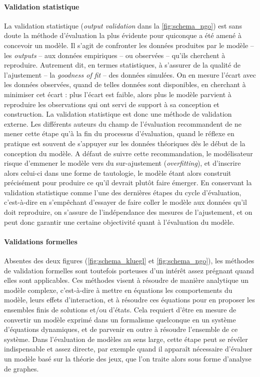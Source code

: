 \paragraph{Validation statistique}
La validation statistique (\og \textit{output validation}\fg{} dans la \cref{fig:schema_ngo}) est sans doute la méthode d'évaluation la plus évidente pour quiconque a été amené à concevoir un modèle. Il s'agit de confronter les données produites par le modèle -- les \textit{outputs} --
aux données empiriques -- ou observées -- qu'ils cherchent à reproduire.
Autrement dit, en termes statistiques, à s'assurer de la qualité de l'ajustement -- la \textit{goodness of fit} -- des données simulées.
On en mesure l'écart avec les données observées, quand de telles données sont disponibles, en cherchant à minimiser cet écart :
	plus l'écart est faible, alors plus le modèle parvient à reproduire les observations qui ont servi de support à sa conception et construction.
La validation statistique est donc une méthode de validation externe.
Les différents auteurs du champ de l'évaluation recommandent de ne mener cette étape qu'à la fin du processus d'évaluation, quand le réflexe en pratique est souvent de s'appuyer sur les données théoriques dès le début de la conception du modèle.
A défaut de suivre cette recommandation, le modélisateur risque d'emmener le modèle vers du \og sur-ajustement \fg{} (\textit{overfitting}), et d'inscrire alors celui-ci dans une forme de tautologie, le modèle étant alors construit précisément pour produire ce qu'il devrait plutôt faire émerger.
En conservant la validation statistique comme l'une des dernières étapes du cycle d'évaluation, c'est-à-dire en s'empêchant d'essayer de faire coller le modèle aux données qu'il doit reproduire, on s'assure de l'indépendance des mesures de l'ajustement, et on peut donc garantir une certaine objectivité quant à l'évaluation du modèle.

\paragraph{Validations formelles}
Absentes des deux figures (\ref{fig:schema_kluegl} et \ref{fig:schema_ngo}), les méthodes de validation formelles sont toutefois porteuses d'un intérêt assez prégnant quand elles sont applicables.
Ces méthodes visent à résoudre de manière analytique un modèle complexe, c'est-à-dire à mettre en équations les comportements du modèle, leurs effets d'interaction, et à résoudre ces équations pour en proposer les ensembles finis de solutions et/ou d'états.
Cela requiert d'être en mesure de convertir un modèle exprimé dans un formalisme quelconque en un système d'équations dynamiques, et de parvenir en outre à résoudre l'ensemble de ce système.
Dans l'évaluation de modèles au sens large, cette étape peut se révéler indispensable et assez directe, par exemple quand il apparaît nécessaire d'évaluer un modèle basé sur la théorie des jeux, que l'on traite alors sous forme d'analyse de graphes.

